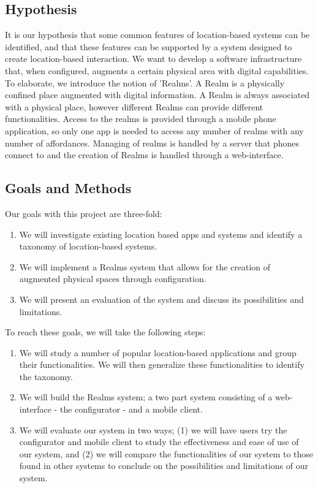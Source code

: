
\subsection{Hypothesis} %
\label{sub:hypothesis}
It is our hypothesis that some common features of location-based systems can be identified, and that these features can be supported by a system designed to create location-based interaction. We want to develop a software infrastructure that, when configured, augments a certain physical area with digital capabilities. To elaborate, we introduce the notion of 'Realms'. A Realm is a physically confined place augmented with digital information. A Realm is always associated with a physical place, however different Realms can provide different functionalities. Access to the realms is provided through a mobile phone application, so only one app is needed to access any number of realms with any number of affordances. Managing of realms is handled by a server that phones connect to and the creation of Realms is handled through a web-interface. 

\subsection{Goals and Methods} %
\label{sub:goals_and_methods}
Our goals with this project are three-fold:
\begin{enumerate}
	\item We will investigate existing location based apps and systems and identify a taxonomy of location-based systems.
	\item We will implement a Realms system that allows for the creation of augmented physical spaces through configuration. 
	\item We will present an evaluation of the system and discuss its possibilities and limitations.
\end{enumerate}

\noindent To reach these goals, we will take the following steps:

\begin{enumerate}
	\item We will study a number of popular location-based applications and group their functionalities. We will then generalize these functionalities to identify the taxonomy.
	\item We will build the Realms system; a two part system consisting of a web-interface - the configurator - and a mobile client.
	\item We will evaluate our system in two ways; (1) we will have users try the configurator and mobile client to study the effectiveness and ease of use of our system, and (2) we will compare the functionalities of our system to those found in other systems to conclude on the possibilities and limitations of our system.
\end{enumerate}

